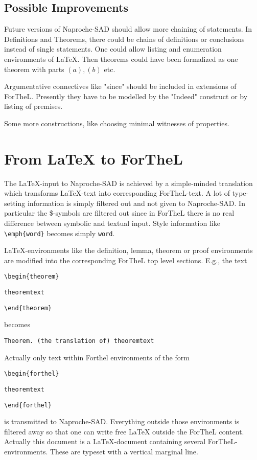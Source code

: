 \documentclass{article}
\begin{document}
\subsection{Possible Improvements} 

Future versions of Naproche-SAD should allow more chaining of statements. In Definitions and Theorems, there could be chains of definitions or conclusions instead of single statements. One could allow listing and enumeration environments of {\LaTeX}. Then theorems could have been formalized as one theorem with parts $(a),(b)$ etc.

Argumentative connectives like "since" should be included in extensions of ForTheL. Presently they have to be modelled by the "Indeed" construct or by listing of premises.

Some more constructions, like choosing minimal witnesses of 
properties.


\section{{From \LaTeX} to ForTheL}
The {\LaTeX}-input to Naproche-SAD is achieved by a simple-minded translation which transforms {\LaTeX}-text into corresponding ForTheL-text. A lot of type-setting information is simply filtered out and not given to Naproche-SAD. In particular the {\$}-symbols are filtered out since in ForTheL there is no real difference between symbolic and textual input. Style information like {\tt \textbackslash emph\{word\}} becomes simply {\tt word}.

{\LaTeX}-environments like the definition, lemma, theorem or proof environments are modified into the corresponding ForTheL top level sections. E.g., the text

{\tt \textbackslash begin\{theorem\}}

{\tt theoremtext}

{\tt \textbackslash end\{theorem\}}

becomes

{\tt Theorem. (the translation of) theoremtext}


Actually only text within Forthel environments of the form

{\tt \textbackslash begin\{forthel\}}

{\tt theoremtext}

{\tt \textbackslash end\{forthel\}}

is transmitted to Naproche-SAD. Everything outside those environments is filtered away so that one can write free {\LaTeX} outside the ForTheL content. Actually this document is a {\LaTeX}-document containing several ForTheL-environments. These are typeset with a vertical marginal line.
\end{document}
